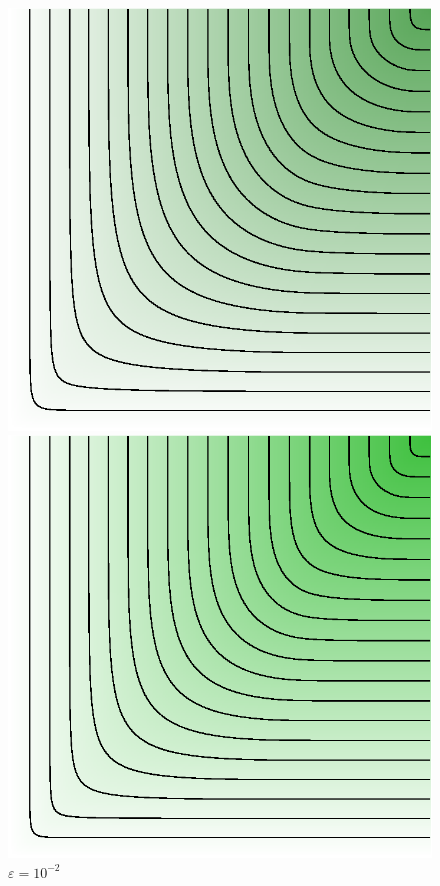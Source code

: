 \documentclass[cn,10pt,math=newtx,citestyle=gb7714-2015,bibstyle=gb7714-2015]{elegantbook}
\begin{document}
\begin{figure}[H]
\begin{minipage}{0.8\linewidth}
\begin{minipage}{0.19\linewidth}
\begin{mdframed}
		\end{mdframed}
		\caption*{$\varepsilon = 10^{-1}$}
	\end{minipage}
	\begin{minipage}{0.19\linewidth}
		\centering
		\begin{mdframed}
		    \includegraphics[width=\linewidth]{figure/fig4.4/evol-copula-33.eps}
		\end{mdframed}
		\caption*{$\varepsilon = 10^{-2}$}
	\end{minipage}
	\begin{minipage}{0.19\linewidth}
		\centering
		\begin{mdframed}
		    \includegraphics[width=\linewidth]{figure/fig4.4/evol-copula-38.eps}

\end{mdframed}
\end{minipage}
\end{minipage}
\end{figure}
\end{document}
